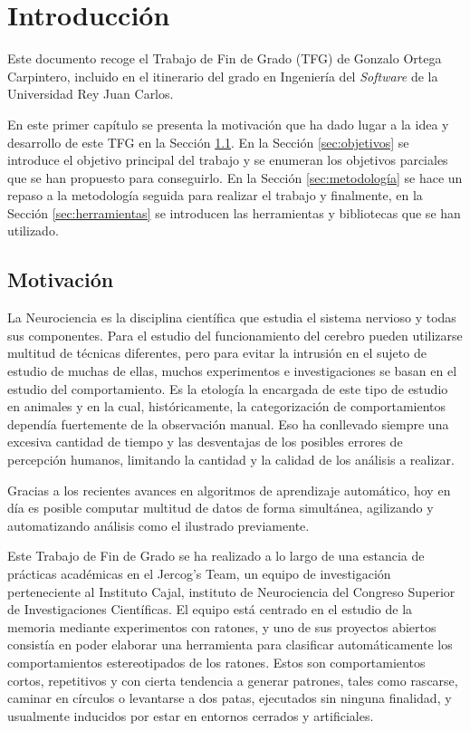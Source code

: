 \chapter{Introducción}
Este documento recoge el Trabajo de Fin de Grado (TFG) de Gonzalo Ortega Carpintero, incluido en el itinerario del grado en Ingeniería del \textit{Software} de la Universidad Rey Juan Carlos.

En este primer capítulo se presenta la motivación que ha dado lugar a la idea y desarrollo de este TFG en la Sección \ref{sec:motivacion}. En la Sección \ref{sec:objetivos} se introduce el objetivo principal del trabajo y se enumeran los objetivos parciales que se han propuesto para conseguirlo. En la Sección \ref{sec:metodología} se hace un repaso a la metodología seguida para realizar el trabajo y finalmente, en la Sección \ref{sec:herramientas} se introducen las herramientas y bibliotecas que se han utilizado.

\section{Motivación} \label{sec:motivacion}

La Neurociencia es la disciplina científica que estudia el sistema nervioso y todas sus componentes. Para el estudio del funcionamiento del cerebro pueden utilizarse multitud de técnicas diferentes, pero para evitar la intrusión en el sujeto de estudio de muchas de ellas, muchos experimentos e investigaciones se basan en el estudio del comportamiento. Es la etología la encargada de este tipo de estudio en animales y en la cual, históricamente, la categorización de comportamientos dependía fuertemente de la observación manual. Eso ha conllevado siempre una excesiva cantidad de tiempo y las desventajas de los posibles errores de percepción humanos, limitando la cantidad y la calidad de los análisis a realizar.

Gracias a los recientes avances en algoritmos de aprendizaje automático, hoy en día es posible computar multitud de datos de forma simultánea, agilizando y automatizando análisis como el ilustrado previamente.

Este Trabajo de Fin de Grado se ha realizado a lo largo de una estancia de prácticas académicas en el Jercog's Team, un equipo de investigación perteneciente al Instituto Cajal, instituto de Neurociencia del Congreso Superior de Investigaciones Científicas. El equipo está centrado en el estudio de la memoria mediante experimentos con ratones, y uno de sus proyectos abiertos consistía en poder elaborar una herramienta para clasificar automáticamente los comportamientos estereotipados de los ratones. Estos son comportamientos cortos, repetitivos y con cierta tendencia a generar patrones, tales como rascarse, caminar en círculos o levantarse a dos patas, ejecutados sin ninguna finalidad, y usualmente inducidos por estar en entornos cerrados y artificiales.

